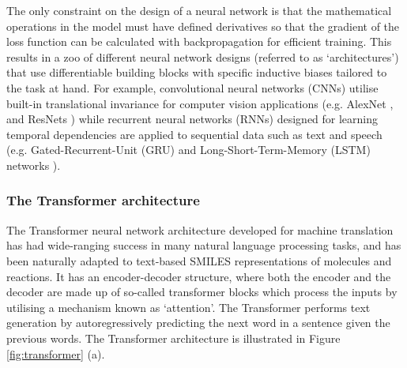 The only constraint on the design of a neural network is that the mathematical operations in the model must have defined derivatives so that the gradient of the loss function can be calculated with backpropagation for efficient training. This results in a zoo of different neural network designs (referred to as `architectures') that use differentiable building blocks with specific inductive biases tailored to the task at hand. For example, convolutional neural networks (CNNs) utilise built-in translational invariance for computer vision applications (e.g. AlexNet \cite{Krizhevsky2012AlexNet}, and ResNets \cite{He2015ResNet}) while recurrent neural networks (RNNs) designed for learning temporal dependencies are applied to sequential data such as text \cite{Cho2014RNN} and speech \cite{Lipton2015RNN} (e.g. Gated-Recurrent-Unit (GRU) \cite{Chung2014GRU} and Long-Short-Term-Memory (LSTM) networks \cite{Hochreiter1997LSTM}). 

\subsubsection{The Transformer architecture} \label{sec:transformer_background}

The Transformer neural network architecture \cite{Vaswani2017} developed for machine translation has had wide-ranging success in many natural language processing tasks, and has been naturally adapted to text-based SMILES representations of molecules and reactions. It has an encoder-decoder structure, where both the encoder and the decoder are made up of so-called transformer blocks which process the inputs by utilising a mechanism known as `attention'. The Transformer performs text generation by autoregressively predicting the next word in a sentence given the previous words. The Transformer architecture is illustrated in Figure \ref{fig:transformer} (a).

